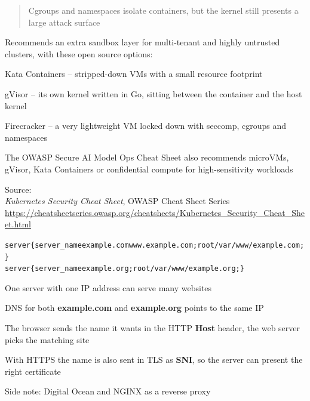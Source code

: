 \documentclass[Screen16to9,17pt]{foils}
\begin{document}

\begin{quote}
Cgroups and namespaces isolate containers, but the kernel still presents a large attack surface
\end{quote}

Recommends an extra sandbox layer for multi-tenant and highly untrusted clusters, with these open source options:
\begin{list2}
\item Kata Containers – stripped-down VMs with a small resource footprint
\item gVisor – its own kernel written in Go, sitting between the container and the host kernel
\item Firecracker – a very lightweight VM locked down with seccomp, cgroups and namespaces
\end{list2}

The OWASP Secure AI Model Ops Cheat Sheet also recommends microVMs, gVisor, Kata Containers or confidential compute for high-sensitivity workloads

Source: {\footnotesize\\
\emph{Kubernetes Security Cheat Sheet}, OWASP Cheat Sheet Series \\
\url{https://cheatsheetseries.owasp.org/cheatsheets/Kubernetes_Security_Cheat_Sheet.html}}



\begin{alltt}\footnotesize
server \{ server_name example.com www.example.com; root /var/www/example.com; \}
server \{ server_name example.org; root /var/www/example.org; \}
\end{alltt}


\begin{list2}
\item One server with one IP address can serve many websites
\item DNS for both {\bf example.com} and {\bf example.org} points to the same IP
\item The browser sends the name it wants in the HTTP {\bf Host} header, the web server picks the matching site
\item With HTTPS the name is also sent in TLS as {\bf SNI}, so the server can present the right certificate
\end{list2}

Side note: Digital Ocean and NGINX as a reverse proxy
\end{document}
